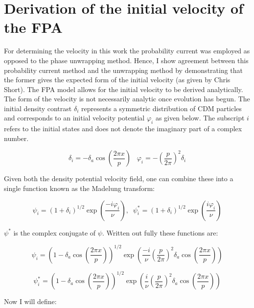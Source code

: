 %
%
\section{Derivation of the initial velocity of the FPA}
\label{app_v}
For determining the velocity in this work the probability current was employed as opposed to the phase unwrapping method. Hence, I show agreement between this probability current method and the unwrapping method by demonstrating that the former gives the expected form of the initial velocity (as given by Chris Short). The FPA model allows for the initial velocity to be derived analytically. The form of the velocity is not necessarily analytic once evolution has begun. The initial density contrast $\delta_i$ represents a symmetric distribution of CDM particles and corresponds to an initial velocity potential $\varphi_i$ as given below. The subscript $i$ refers to the initial states and does not denote the imaginary part of a complex number.

\begin{equation}
 \delta_i = - \delta_a \cos\left(\frac{2 \pi x}{p}\right) \;\;\;
 \varphi_i = - \left(\frac{p}{2 \pi} \right)^2 \delta_i
\end{equation}

Given both the density potential velocity field, one can combine these into a single function known as the Madelung transform:

\begin{equation}
 \psi_i = (1+ \delta_i)^{1/2}\exp\left(\frac{-i\varphi_i}{\nu}\right), \;\; \psi_i^* = (1+ \delta_i)^{1/2}\exp\left(\frac{i\varphi_i}{\nu}\right)
\end{equation}

$\psi^*$ is the complex conjugate of $\psi$. Written out fully these functions are:

\begin{equation}
 \psi_i = \left(1- \delta_a \cos\left(\frac{2 \pi x}{p}\right)\right)^{1/2}
 \exp\left(\frac{-i}{\nu}(\frac{p}{2\pi})^2 \delta_a \cos\left(\frac{2 \pi x}{p}\right) \right)
\end{equation}

\begin{equation}
 \psi_i^* = \left(1- \delta_a \cos\left(\frac{2 \pi x}{p}\right)\right)^{1/2}
 \exp\left( \frac{i}{\nu}(\frac{p}{2\pi})^2 \delta_a \cos\left(\frac{2 \pi x}{p}\right) \right)
\end{equation}

Now I will define:

